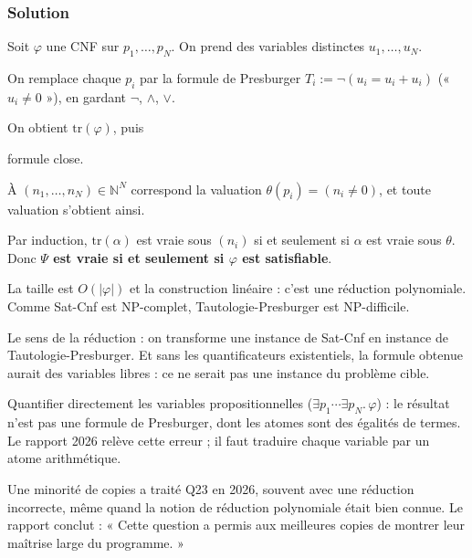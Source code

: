 \documentclass[11pt,a4paper]{article}
\newcommand{\equationajustee}[1]{%
  \sbox{\boiteequation}{$\displaystyle #1$}%
  \ifdim\wd\boiteequation>\linewidth
    \[\resizebox{\linewidth}{!}{\usebox{\boiteequation}}\]%
  \else
    \[#1\]%
  \fi}
\begin{document}
\hypertarget{solution-22}{%
\subsubsection{Solution}\label{solution-22}}

Soit \(\varphi\) une CNF sur \(p_1,\dots,p_N\). On prend des variables distinctes \(u_1,\dots,u_N\).

On remplace chaque \(p_i\) par la formule de Presburger \(T_i:=\neg(u_i=u_i+u_i)\) (« \(u_i\ne0\) »), en gardant \(\neg\), \(\wedge\), \(\vee\).

On obtient \(\mathrm{tr}(\varphi)\), puis

\equationajustee{\boxed{\Psi:=\exists u_1.\exists u_2\cdots\exists u_N.\ \mathrm{tr}(\varphi)}}

formule close.

À \((n_1,\dots,n_N)\in{\mathbb{N}}^N\) correspond la valuation \(\theta(p_i)=(n_i\ne0)\), et toute valuation s'obtient ainsi.

Par induction, \(\mathrm{tr}(\alpha)\) est vraie sous \((n_i)\) si et seulement si \(\alpha\) est vraie sous \(\theta\). Donc \textbf{\(\Psi\) est vraie si et seulement si \(\varphi\) est satisfiable}.

La taille est \(O(|\varphi|)\) et la construction linéaire : c'est une réduction polynomiale. Comme Sat-Cnf est NP-complet, Tautologie-Presburger est NP-difficile.

\begin{piege}

Le sens de la réduction : on transforme une instance de Sat-Cnf en instance de Tautologie-Presburger. Et sans les quantificateurs existentiels, la formule obtenue aurait des variables libres : ce ne serait pas une instance du problème cible.

\end{piege}

\begin{piege}

Quantifier directement les variables propositionnelles (\(\exists p_1\cdots\exists p_N.\,\varphi\)) : le résultat n'est pas une formule de Presburger, dont les atomes sont des égalités de termes. Le rapport 2026 relève cette erreur ; il faut traduire chaque variable par un atome arithmétique.

\end{piege}

\begin{jury}

Une minorité de copies a traité Q23 en 2026, souvent avec une réduction incorrecte, même quand la notion de réduction polynomiale était bien connue. Le rapport conclut : « Cette question a permis aux meilleures copies de montrer leur maîtrise large du programme. »

\end{jury}
\end{document}

